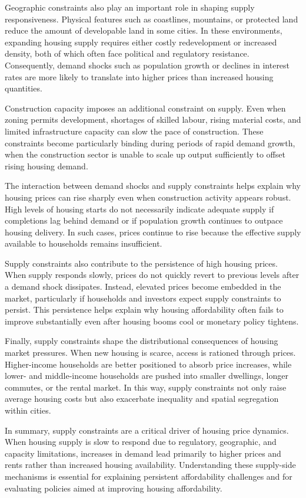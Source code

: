 \documentclass[11pt]{article}
\begin{document}
Geographic constraints also play an important role in shaping supply responsiveness. Physical features such as coastlines, mountains, or protected land reduce the amount of developable land in some cities. In these environments, expanding housing supply requires either costly redevelopment or increased density, both of which often face political and regulatory resistance. Consequently, demand shocks such as population growth or declines in interest rates are more likely to translate into higher prices than increased housing quantities.

Construction capacity imposes an additional constraint on supply. Even when zoning permits development, shortages of skilled labour, rising material costs, and limited infrastructure capacity can slow the pace of construction. These constraints become particularly binding during periods of rapid demand growth, when the construction sector is unable to scale up output sufficiently to offset rising housing demand.

The interaction between demand shocks and supply constraints helps explain why housing prices can rise sharply even when construction activity appears robust. High levels of housing starts do not necessarily indicate adequate supply if completions lag behind demand or if population growth continues to outpace housing delivery. In such cases, prices continue to rise because the effective supply available to households remains insufficient.

Supply constraints also contribute to the persistence of high housing prices. When supply responds slowly, prices do not quickly revert to previous levels after a demand shock dissipates. Instead, elevated prices become embedded in the market, particularly if households and investors expect supply constraints to persist. This persistence helps explain why housing affordability often fails to improve substantially even after housing booms cool or monetary policy tightens.

Finally, supply constraints shape the distributional consequences of housing market pressures. When new housing is scarce, access is rationed through prices. Higher-income households are better positioned to absorb price increases, while lower- and middle-income households are pushed into smaller dwellings, longer commutes, or the rental market. In this way, supply constraints not only raise average housing costs but also exacerbate inequality and spatial segregation within cities.

In summary, supply constraints are a critical driver of housing price dynamics. When housing supply is slow to respond due to regulatory, geographic, and capacity limitations, increases in demand lead primarily to higher prices and rents rather than increased housing availability. Understanding these supply-side mechanisms is essential for explaining persistent affordability challenges and for evaluating policies aimed at improving housing affordability.
\end{document}
